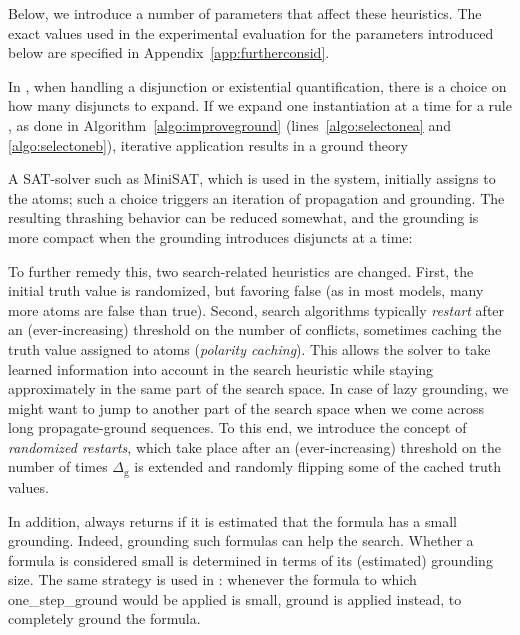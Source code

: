 \documentclass[11pt]{article}
\newcommand{\m}[1]{\ensuremath{#1}\xspace}
\newcommand{\D}{\m{\Delta}}
\newcommand{\logicname}[1]{\text{\sc #1}\xspace}
\newcommand{\idp}{\logicname{IDP}}
\theoremstyle{plain}
\theoremstyle{definition}
\theoremstyle{example_basic}
\theoremstyle{example_contd}
\theoremstyle{plain}
\newcommand{\groundone}{\textsf{one\_step\_ground}\xspace}
\newcommand{\ground}{\textsf{ground}\xspace}
\newcommand{\Dg}{\ensuremath{\D_\text{g}}\xspace}
\newcommand{\change}[1]{#1}
\begin{document}
\change{Below, we introduce a number of parameters that affect these heuristics. The exact values used in the experimental evaluation for the parameters introduced below are specified in Appendix~\ref{app:furtherconsid}. } 

In \splitandground, when handling a disjunction or existential quantification, there is a choice on how many disjuncts to expand. If we expand one instantiation at a time for a rule , as done in Algorithm~\ref{algo:improveground} (lines~\ref{algo:selectonea} and \ref{algo:selectoneb}), iterative application results in a ground theory 


\change{A SAT-solver such as MiniSAT, which is used in the \idp
  system, initially assigns  to the  atoms; such a
  choice triggers an iteration of propagation and grounding. The
  resulting thrashing behavior can be reduced somewhat, and the
  grounding is more compact when the grounding introduces 
  disjuncts at a time:}
 

To further remedy this, two search-related heuristics are changed.
First, the initial truth value is randomized, but favoring false (as in most models, many more atoms are false than true). 
Second, search algorithms typically \emph{restart} after an (ever-increasing) threshold on the number of conflicts, sometimes caching the truth value assigned to atoms (\emph{polarity caching}). This allows the solver to take learned information into account in the search heuristic while staying approximately in the same part of the search space. In case of lazy grounding, we might want to jump to another part of the search space when we come across long propagate-ground sequences. To this end, we introduce the concept of \emph{randomized restarts}, which take place after an (ever-increasing) threshold on the number of times \Dg is extended and randomly flipping some of the cached truth values.

In addition, \buildconstr always returns \algfalse if it is estimated that
the formula has a small grounding. Indeed, grounding such formulas
can help the search. Whether a formula is considered small is determined in terms of its (estimated) grounding size. The same strategy is used in \splitandground: whenever the formula to which \groundone would be applied is small, \ground is applied instead, to completely ground the formula. 
\end{document}
